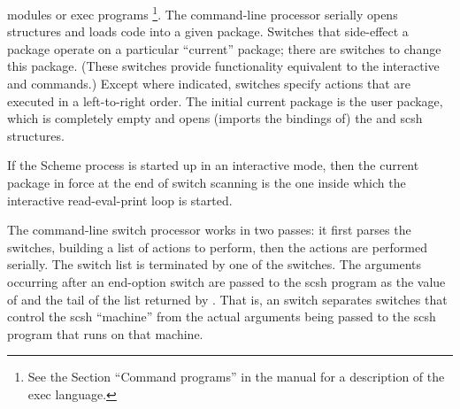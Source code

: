 modules or {\scm} exec programs \footnote{See the Section ``Command
  programs'' in the {\scm} manual for a description of the exec language.}.
The command-line processor serially opens structures and loads code
into a given package.  Switches that side-effect a package operate on
a particular ``current'' package; there are switches to change this
package.  (These switches provide functionality equivalent to the
interactive    and  commands.)
Except where indicated, switches specify actions that are executed in
a left-to-right order.  The initial current package is the user
package, which is completely empty and opens (imports the bindings of)
the \RnRS{} and scsh structures.

If the Scheme process is started up in an interactive mode, then the current
package in force at the end of switch scanning is the one inside which
the interactive read-eval-print loop is started.

The command-line switch processor works in two passes:
it first parses the switches, building a list of actions to perform, 
then the actions are performed serially.
The switch list is terminated by one of the  switches.
The  arguments occurring after an end-option switch are 
passed to the scsh program as the value of 
and the tail of the list returned by .
That is, an  switch separates switches that control
the scsh ``machine'' from the actual arguments being passed to the scsh
program that runs on that machine.

